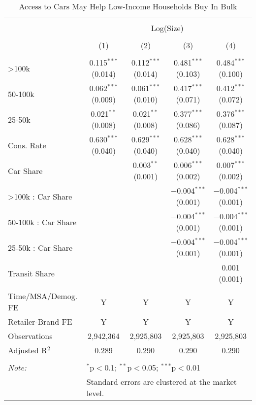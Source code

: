 
\begin{table}[!htbp] \centering 
  \caption{Access to Cars May Help Low-Income Households Buy In Bulk} 
  \label{tab:packageSizeFullTpCar} 
\begin{tabular}{@{\extracolsep{5pt}}lcccc} 
\\[-1.8ex]\hline 
\hline \\[-1.8ex] 
 & \multicolumn{4}{c}{Log(Size)} \\ 
\\[-1.8ex] & (1) & (2) & (3) & (4)\\ 
\hline \\[-1.8ex] 
 >100k & 0.115$^{***}$ (0.014) & 0.112$^{***}$ (0.014) & 0.481$^{***}$ (0.103) & 0.484$^{***}$ (0.100) \\ 
  50-100k & 0.062$^{***}$ (0.009) & 0.061$^{***}$ (0.010) & 0.417$^{***}$ (0.071) & 0.412$^{***}$ (0.072) \\ 
  25-50k & 0.021$^{**}$ (0.008) & 0.021$^{**}$ (0.008) & 0.377$^{***}$ (0.086) & 0.376$^{***}$ (0.087) \\ 
  Cons. Rate & 0.630$^{***}$ (0.040) & 0.629$^{***}$ (0.040) & 0.628$^{***}$ (0.040) & 0.628$^{***}$ (0.040) \\ 
  Car Share &  & 0.003$^{**}$ (0.001) & 0.006$^{***}$ (0.002) & 0.007$^{***}$ (0.002) \\ 
  >100k : Car Share &  &  & $-$0.004$^{***}$ (0.001) & $-$0.004$^{***}$ (0.001) \\ 
  50-100k : Car Share &  &  & $-$0.004$^{***}$ (0.001) & $-$0.004$^{***}$ (0.001) \\ 
  25-50k : Car Share &  &  & $-$0.004$^{***}$ (0.001) & $-$0.004$^{***}$ (0.001) \\ 
  Transit Share &  &  &  & 0.001 (0.001) \\ 
 \hline \\[-1.8ex] 
Time/MSA/Demog. FE & Y & Y & Y & Y \\ 
Retailer-Brand FE & Y & Y & Y & Y \\ 
Observations & 2,942,364 & 2,925,803 & 2,925,803 & 2,925,803 \\ 
Adjusted R$^{2}$ & 0.289 & 0.290 & 0.290 & 0.290 \\ 
\hline 
\hline \\[-1.8ex] 
\textit{Note:}  & \multicolumn{4}{l}{$^{*}$p$<$0.1; $^{**}$p$<$0.05; $^{***}$p$<$0.01} \\ 
 & \multicolumn{4}{l}{Standard errors are clustered at the market level.} \\ 

\end{tabular}
\end{table}
